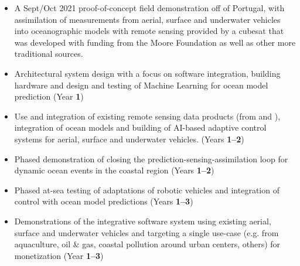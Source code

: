 \begin{itemize}[noitemsep,topsep=0pt,parsep=5pt,partopsep=10pt]


  
\end{itemize}

\else

\begin{itemize}[noitemsep,topsep=0pt,parsep=5pt,partopsep=10pt]

\item A Sept/Oct 2021 proof-of-concept field demonstration off of
  Portugal, with assimilation of measurements from aerial, surface and
  underwater vehicles into oceanographic models with remote sensing
  provided by a cubesat that was developed with funding from the Moore
  Foundation as well as other more traditional sources.

\item Architectural system design with a focus on software
  integration, building hardware and design and testing of Machine
  Learning for ocean model prediction (Year \textbf{1})

\item Use and integration of existing remote sensing data products
  (from \esa and \nase), integration of ocean models and building of
  AI-based adaptive control systems for aerial, surface and underwater
  vehicles.  (Years \textbf{1--2})

\item Phased demonstration of closing the
  prediction-sensing-assimilation loop for dynamic ocean events in the
  coastal region (Years \textbf{1--2})

\item Phased at-sea testing of adaptations of robotic vehicles and
  integration of control with ocean model predictions (Years
  \textbf{1--3})

\item Demonstrations of the integrative software system using existing
  aerial, surface and underwater vehicles and targeting a single
  use-case (e.g. from aquaculture, oil \& gas, coastal pollution
  around urban centers, others) for monetization (Year \textbf{1--3})


\end{itemize}
